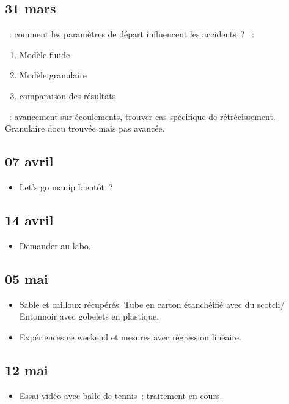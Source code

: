 \documentclass[a4paper, 11pt, final, garamond]{book}
\begin{document}
\subsection{31 mars}
\begin{itemize}
  ~: comment les paramètres de départ influencent les
    accidents~?
  ~:
    \begin{enumerate}[label=\Roman*]
      \item Modèle fluide
      \item Modèle granulaire
      \item comparaison des résultats
    \end{enumerate}
  ~: avancement sur écoulements, trouver cas spécifique de
    rétrécissement. Granulaire docu trouvée mais pas avancée.
\end{itemize}

\subsection{07 avril}
\begin{itemize}
  \item Let's go manip bientôt~?
\end{itemize}

\subsection{14 avril}
\begin{itemize}
  ~: super, manip univ Le Mans simulation numérique~: super
    ressource tout clé en main.
  \item Demander au labo.
\end{itemize}

\subsection{05 mai}
\begin{itemize}
  \item Sable et cailloux récupérés. Tube en carton étanchéifié avec du scotch/
    Entonnoir avec gobelets en plastique.
  \item Expériences ce weekend et mesures avec régression linéaire.
\end{itemize}

\subsection{12 mai}
\begin{itemize}
  \item Essai vidéo avec balle de tennis~: traitement en cours.
\end{itemize}
\end{document}
